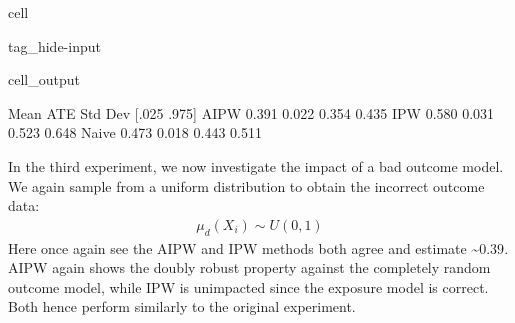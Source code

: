 \documentclass[letterpaper,10pt,english]{jupyterBook}
\begin{document}
\begin{sphinxuseclass}{cell}
\begin{sphinxuseclass}{tag_hide-input}\begin{sphinxVerbatimOutput}

\begin{sphinxuseclass}{cell_output}
\begin{sphinxVerbatim}[commandchars=\\\{\}]
       Mean ATE  Std Dev  [.025  .975]
AIPW      0.391    0.022  0.354  0.435
IPW       0.580    0.031  0.523  0.648
Naive     0.473    0.018  0.443  0.511
\end{sphinxVerbatim}

\noindent{}

\end{sphinxuseclass}\end{sphinxVerbatimOutput}

\end{sphinxuseclass}
\end{sphinxuseclass}
\sphinxAtStartPar
In the third experiment, we now investigate the impact of a bad outcome model. We again sample from a uniform distribution to obtain the incorrect outcome data:
\begin{equation*}
\begin{split}\mu_d(X_i) \sim U(0,1) \end{split}
\end{equation*}
\sphinxAtStartPar
Here once again see the AIPW and IPW methods both agree and estimate \textasciitilde{}\(0.39\). AIPW again shows the doubly robust property against the completely random outcome model, while IPW is unimpacted since the exposure model is correct. Both hence perform similarly to the original experiment.
\end{document}

